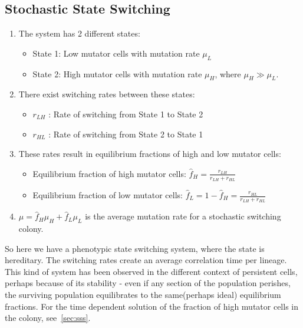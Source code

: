 \subsection{Stochastic State Switching}\label{subsec:sss}
    \begin{enumerate}
        \item The system has 2 different states:
        \begin{itemize}
            \item State 1: Low mutator cells with mutation rate $\mu_{L}$
            \item State 2: High mutator cells with mutation rate $\mu_{H}$, where $\mu_{H} \gg \mu_{L}$.
        \end{itemize}
        \item There exist switching rates between these states:
            \begin{itemize}
                \item $r_{LH}$ : Rate of switching from State 1 to State 2
                \item $r_{HL}$ : Rate of switching from State 2 to State 1
            \end{itemize}
        \item These rates result in equilibrium fractions of high and low mutator cells:
            \begin{itemize}
                \item Equilibrium fraction of high mutator cells: $\hat{f}_{H} = \frac{r_{LH}}{r_{LH} + r_{HL}}$
                \item Equilibrium fraction of low mutator cells: $\hat{f}_{L} = 1 - \hat{f}_{H} = \frac{r_{HL}}{r_{LH} + r_{HL}}$
            \end{itemize}
        \item $\mu = \hat{f}_{H} \mu_{H} + \hat{f}_{L} \mu_{L}$ is the average mutation rate for a stochastic switching colony.
    \end{enumerate}
    So here we have a phenotypic state switching system, where the state is hereditary.
    The switching rates create an average correlation time per lineage.
    This kind of system has been observed in the different context of persistent cells, perhaps because of its stability -
    even if any section of the population perishes, the surviving population equilibrates to the same(perhaps ideal) equilibrium fractions.
    For the time dependent solution of the fraction of high mutator cells in the colony, see~\ref{sec:sss}.


